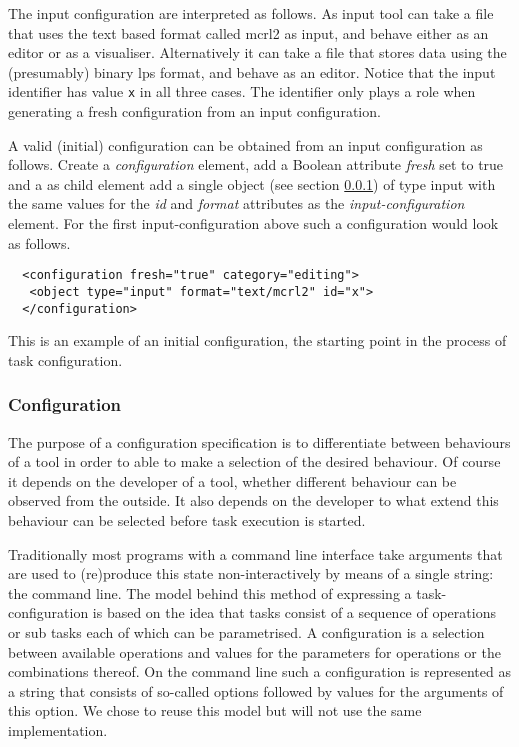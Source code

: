 \documentclass{article}
\begin{document}
   The input configuration are interpreted as follows. As input tool can take a
   file that uses the text based format called mcrl2 as input, and behave
   either as an editor or as a visualiser. Alternatively it can take a file
   that stores data using the (presumably) binary lps format, and behave as an
   editor. Notice that the input identifier has value \verb'x' in all three
   cases.  The identifier only plays a role when generating a fresh
   configuration from an input configuration.

   A valid (initial) configuration can be obtained from an input configuration
   as follows.  Create a \textit{configuration} element, add a Boolean
   attribute \textit{fresh} set to true and a as child element add a single
   object (see section \ref{ss:implementation_configuration}) of type input
   with the same values for the \textit{id} and \textit{format} attributes as
   the \textit{input-configuration} element. For the first input-configuration
   above such a configuration would look as follows.
   \small \begin{verbatim}
  <configuration fresh="true" category="editing">
   <object type="input" format="text/mcrl2" id="x">
  </configuration>\end{verbatim}
  \normalsize
  
   This is an example of an initial configuration, the starting point in the
   process of task configuration.

  \subsubsection{Configuration} \label{ss:implementation_configuration}

   The purpose of a configuration specification is to differentiate between
   behaviours of a tool in order to able to make a selection of the desired
   behaviour. Of course it depends on the developer of a tool, whether
   different behaviour can be observed from the outside. It also depends on the
   developer to what extend this behaviour can be selected before task
   execution is started.

   Traditionally most programs with a command line interface take arguments
   that are used to (re)produce this state non-interactively by means of a
   single string: the command line. The model behind this method of expressing
   a task-configuration is based on the idea that tasks consist of a sequence
   of operations or sub tasks each of which can be parametrised.  A
   configuration is a selection between available operations and values for the
   parameters for operations or the combinations thereof. On the command line such a
   configuration is represented as a string that consists of so-called options
   followed by values for the arguments of this option. We chose to reuse this
   model but will not use the same implementation.
\end{document}
